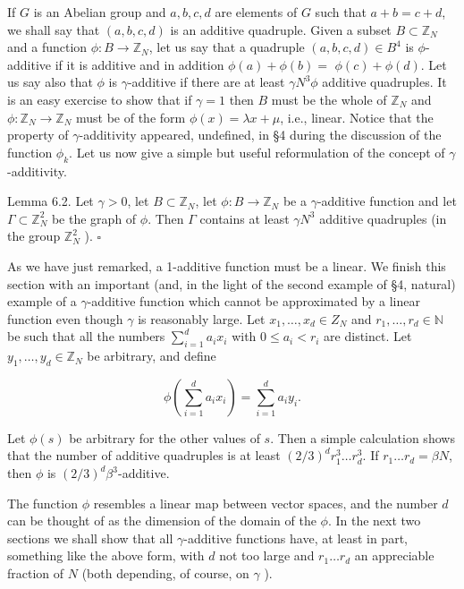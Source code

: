 \documentclass[10pt]{article}
\begin{document}
If $G$ is an Abelian group and $a, b, c, d$ are elements of $G$ such that $a+b=c+d$, we shall say that $(a, b, c, d)$ is an additive quadruple. Given a subset $B \subset \mathbb{Z}_{N}$ and a function $\phi: B \rightarrow \mathbb{Z}_{N}$, let us say that a quadruple $(a, b, c, d) \in B^{4}$ is $\phi$-additive if it is additive and in addition $\phi(a)+\phi(b)=$ $\phi(c)+\phi(d)$. Let us say also that $\phi$ is $\gamma$-additive if there are at least $\gamma N^{3} \phi$ additive quadruples. It is an easy exercise to show that if $\gamma=1$ then $B$ must be the whole of $\mathbb{Z}_{N}$ and $\phi: \mathbb{Z}_{N} \rightarrow \mathbb{Z}_{N}$ must be of the form $\phi(x)=\lambda x+\mu$, i.e., linear. Notice that the property of $\gamma$-additivity appeared, undefined, in §4 during the discussion of the function $\phi_{k}$. Let us now give a simple but useful reformulation of the concept of $\gamma$-additivity.

Lemma 6.2. Let $\gamma>0$, let $B \subset \mathbb{Z}_{N}$, let $\phi: B \rightarrow \mathbb{Z}_{N}$ be a $\gamma$-additive function and let $\Gamma \subset \mathbb{Z}_{N}^{2}$ be the graph of $\phi$. Then $\Gamma$ contains at least $\gamma N^{3}$ additive quadruples (in the group $\mathbb{Z}_{N}^{2}$ ). \(\square\)

As we have just remarked, a 1-additive function must be a linear. We finish this section with an important (and, in the light of the second example of §4, natural) example of a $\gamma$-additive function which cannot be approximated by a linear function even though $\gamma$ is reasonably large. Let $x_{1}, \ldots, x_{d} \in Z_{N}$ and $r_{1}, \ldots, r_{d} \in \mathbb{N}$ be such that all the numbers $\sum_{i=1}^{d} a_{i} x_{i}$ with $0 \leqslant a_{i}<r_{i}$ are distinct. Let $y_{1}, \ldots, y_{d} \in \mathbb{Z}_{N}$ be arbitrary, and define

$$
\phi\left(\sum_{i=1}^{d} a_{i} x_{i}\right)=\sum_{i=1}^{d} a_{i} y_{i} .
$$

Let $\phi(s)$ be arbitrary for the other values of $s$. Then a simple calculation shows that the number of additive quadruples is at least $(2 / 3)^{d} r_{1}^{3} \ldots r_{d}^{3}$. If $r_{1} \ldots r_{d}=\beta N$, then $\phi$ is $(2 / 3)^{d} \beta^{3}$-additive.

The function $\phi$ resembles a linear map between vector spaces, and the number $d$ can be thought of as the dimension of the domain of the $\phi$. In the next two sections we shall show that all $\gamma$-additive functions have, at least in part, something like the above form, with $d$ not too large and $r_{1} \ldots r_{d}$ an appreciable fraction of $N$ (both depending, of course, on $\gamma$ ).
\end{document}
